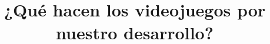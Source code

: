\documentclass{bmcart}
\begin{document}
\begin{frontmatter}

\begin{fmbox}


\title{¿Qué hacen los videojuegos por nuestro desarrollo?}


\author[
   addressref={aff1},                   %
   corref={aff1},                       %
   noteref={n1},                        %
   email={iscgonzpame@gmail.com}   %
]{ }



\address[id=aff1]{%
  , %
  ,                     %
  ,                              %
}
\address[id=aff2]{%
  ,
  ,
  ,
}


\end{fmbox}
\end{frontmatter}
\end{document}
